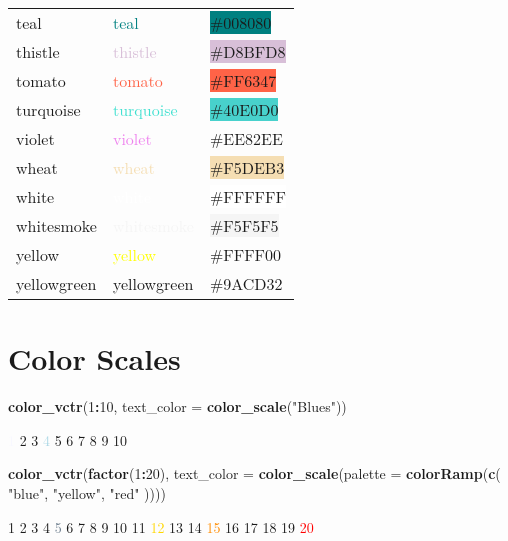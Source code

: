 \documentclass[
]{article}
\newenvironment{Shaded}{\begin{snugshade}}{\end{snugshade}}
\newcommand{\DataTypeTok}[1]{\textcolor[rgb]{0.13,0.29,0.53}{#1}}
\newcommand{\DecValTok}[1]{\textcolor[rgb]{0.00,0.00,0.81}{#1}}
\newcommand{\KeywordTok}[1]{\textcolor[rgb]{0.13,0.29,0.53}{\textbf{#1}}}
\newcommand{\NormalTok}[1]{#1}
\newcommand{\OperatorTok}[1]{\textcolor[rgb]{0.81,0.36,0.00}{\textbf{#1}}}
\newcommand{\StringTok}[1]{\textcolor[rgb]{0.31,0.60,0.02}{#1}}
\begin{document}
\begin{longtable}[]{@{}lll@{}}
teal & \textcolor{teal}{teal} & \colorbox{teal}{\#008080}\tabularnewline
thistle & \textcolor{thistle}{thistle} &
\colorbox{thistle}{\#D8BFD8}\tabularnewline
tomato & \textcolor{tomato}{tomato} &
\colorbox{tomato}{\#FF6347}\tabularnewline
turquoise & \textcolor{turquoise}{turquoise} &
\colorbox{mediumturquoise}{\#40E0D0}\tabularnewline
violet & \textcolor{violet}{violet} &
\colorbox{lavendermagenta}{\#EE82EE}\tabularnewline
wheat & \textcolor{wheat}{wheat} &
\colorbox{wheat}{\#F5DEB3}\tabularnewline
white & \textcolor{white}{white} &
\colorbox{white}{\#FFFFFF}\tabularnewline
whitesmoke & \textcolor{whitesmoke}{whitesmoke} &
\colorbox{whitesmoke}{\#F5F5F5}\tabularnewline
yellow & \textcolor{yellow}{yellow} &
\colorbox{electricyellow}{\#FFFF00}\tabularnewline
yellowgreen & \textcolor{yellow-green}{yellowgreen} &
\colorbox{yellow-green}{\#9ACD32}\tabularnewline
\bottomrule
\end{longtable}

\hypertarget{color-scales}{%
\section{Color Scales}\label{color-scales}}

\begin{Shaded}
\begin{Highlighting}[]
\KeywordTok{color_vctr}\NormalTok{(}\DecValTok{1}\OperatorTok{:}\DecValTok{10}\NormalTok{, }\DataTypeTok{text_color =} \KeywordTok{color_scale}\NormalTok{(}\StringTok{"Blues"}\NormalTok{))}
\end{Highlighting}
\end{Shaded}

\textcolor{ghostwhite}{1} \textcolor{lightlavender}{2}
\textcolor{beaublue}{3} \textcolor{lightblue}{4}
\textcolor{carolinablue}{5} \textcolor{bluegray}{6}
\textcolor{tuftsblue}{7} \textcolor{denim}{8}
\textcolor{mediumelectricblue}{9} \textcolor{darkmidnightblue}{10}

\begin{Shaded}
\begin{Highlighting}[]
\KeywordTok{color_vctr}\NormalTok{(}\KeywordTok{factor}\NormalTok{(}\DecValTok{1}\OperatorTok{:}\DecValTok{20}\NormalTok{), }\DataTypeTok{text_color =} \KeywordTok{color_scale}\NormalTok{(}\DataTypeTok{palette =} \KeywordTok{colorRamp}\NormalTok{(}\KeywordTok{c}\NormalTok{(}
  \StringTok{"blue"}\NormalTok{, }\StringTok{"yellow"}\NormalTok{, }\StringTok{"red"}
\NormalTok{))))}
\end{Highlighting}
\end{Shaded}

\textcolor{ao}{1} \textcolor{palatinateblue}{2}
\textcolor{palatinateblue}{3} \textcolor{uclablue}{4}
\textcolor{slategray}{5} \textcolor{battleshipgrey}{6}
\textcolor{asparagus}{7} \textcolor{oldgold}{8} \textcolor{pear}{9}
\textcolor{aureolin}{10} \textcolor{canaryyellow}{11}
\textcolor{gold}{12} \textcolor{selectiveyellow}{13}
\textcolor{orangepeel}{14} \textcolor{darkorange}{15}
\textcolor{safetyorange}{16} \textcolor{internationalorange}{17}
\textcolor{coquelicot}{18} \textcolor{scarlet}{19} \textcolor{red}{20}
\end{document}
